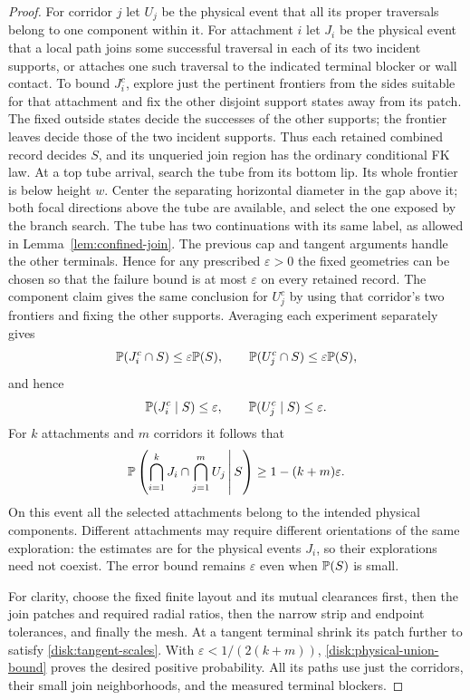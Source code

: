 \begin{proof}
For corridor $j$ let $U_j$ be the physical event that all its proper
traversals belong to one component within it. For attachment $i$ let
$J_i$ be the physical event that a local path joins some successful
traversal in each of its two incident supports, or attaches one such
traversal to the indicated terminal blocker or wall contact. To bound
$J_i^c$, explore just the pertinent frontiers from the sides suitable
for that attachment and fix the other disjoint support states away
from its patch. The fixed outside states decide the successes of the
other supports; the frontier leaves decide those of the two incident
supports. Thus each retained combined record decides $S$, and its
unqueried join region has the ordinary conditional FK law. At a top
tube arrival, search the tube from its bottom lip.
Its whole frontier is below height $w$. Center the separating
horizontal diameter in the gap above it; both focal directions above
the tube are available, and select the one exposed by the branch
search. The tube has two continuations with its same label, as allowed
in Lemma~\ref{lem:confined-join}. The previous cap and tangent arguments
handle the other terminals. Hence for any prescribed $\varepsilon>0$
the fixed geometries can be chosen so that the failure bound is at
most $\varepsilon$ on every retained record. The component claim
gives the same conclusion for $U_j^c$ by using that corridor's two
frontiers and fixing the other supports. Averaging each experiment
separately gives
\[
 \mathbb P(J_i^c\cap S)\le\varepsilon\mathbb P(S),\qquad
 \mathbb P(U_j^c\cap S)\le\varepsilon\mathbb P(S),
\]
and hence
\begin{equation}\label{disk:conditional-joins}
 \mathbb P(J_i^c\mid S)\le\varepsilon,\qquad
 \mathbb P(U_j^c\mid S)\le\varepsilon.
\end{equation}
For $k$ attachments and $m$ corridors it follows that
\begin{equation}\label{disk:physical-union-bound}
 \mathbb P\left(\bigcap_{i=1}^k J_i\cap
                 \bigcap_{j=1}^m U_j\,\middle|\,S\right)
       \ge 1-(k+m)\varepsilon.
\end{equation}
On this event all the selected attachments belong to the intended
physical components. Different attachments may require different
orientations of the same exploration: the estimates are for the
physical events $J_i$, so their explorations need not coexist. The
error bound remains $\varepsilon$ even when $\mathbb P(S)$ is small.

For clarity, choose the fixed finite layout and its mutual clearances
first, then the join patches and required radial ratios, then the
narrow strip and endpoint tolerances, and finally the mesh. At a
tangent terminal shrink its patch further to satisfy
\eqref{disk:tangent-scales}. With
$\varepsilon<1/(2(k+m))$, \eqref{disk:physical-union-bound} proves
the desired positive probability. All its paths use just the corridors,
their small join neighborhoods, and the measured terminal blockers.


\end{proof}

